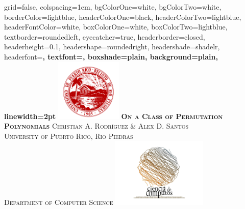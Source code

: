 \documentclass[landscape,final,paperwidth=48in,paperheight=38in]{baposter}
\begin{document}
\begin{poster}%
  {
  grid=false,
  colspacing=1em,
  bgColorOne=white,
  bgColorTwo=white,
  borderColor=lightblue,
  headerColorOne=black,
  headerColorTwo=lightblue,
  headerFontColor=white,
  boxColorOne=white,
  boxColorTwo=lightblue,
  textborder=roundedleft,
  eyecatcher=true,
  headerborder=closed,
  headerheight=0.1\textheight,
  headershape=roundedright,
  headershade=shadelr,
  headerfont=\Large\bf\textsc, %
  textfont={\setlength{\parindent}{1.5em}},
  boxshade=plain,
  background=plain,
  linewidth=2pt
  }
  {\includegraphics[height=8em,keepaspectratio=true]{images/logo_uprrp}} 
  {\bf\textsc{On a Class of Permutation Polynomials}\vspace{0.1em}}
  {\textsc{Christian A. Rodr\'{\i}guez \& Alex D. Santos \\ University of Puerto Rico, Rio Piedras \\ Department of Computer Science}}
  {%
    \includegraphics[height=9em,keepaspectratio=true]{images/logo_ccom}
  }

    \newcommand{\colouredcircle}{%
      \tikz{\useasboundingbox (-0.2em,-0.32em) rectangle(0.2em,0.32em); \draw[draw=black,fill=lightblue,line width=0.03em] (0,0) circle(0.18em);}}


\end{poster}
\end{document}
